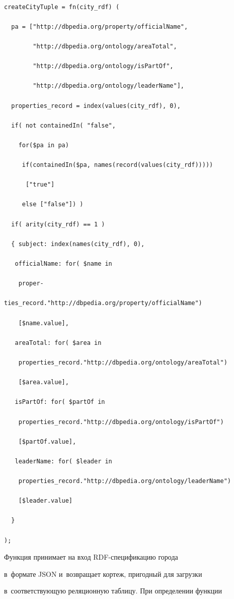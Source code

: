       \begin{verbatim}

createCityTuple = fn(city_rdf) (

  pa = ["http://dbpedia.org/property/officialName",

        "http://dbpedia.org/ontology/areaTotal",

        "http://dbpedia.org/ontology/isPartOf",

        "http://dbpedia.org/ontology/leaderName"],

  properties_record = index(values(city_rdf), 0),

  if( not containedIn( "false",

    for($pa in pa)

     if(containedIn($pa, names(record(values(city_rdf)))))

      ["true"]

     else ["false"]) )

  if( arity(city_rdf) == 1 )

  { subject: index(names(city_rdf), 0),

   officialName: for( $name in

    proper-

ties_record."http://dbpedia.org/property/officialName")

    [$name.value],

   areaTotal: for( $area in

    properties_record."http://dbpedia.org/ontology/areaTotal")

    [$area.value],

   isPartOf: for( $partOf in

    properties_record."http://dbpedia.org/ontology/isPartOf")

    [$partOf.value],

   leaderName: for( $leader in

    properties_record."http://dbpedia.org/ontology/leaderName")

    [$leader.value]

  }

);

\end{verbatim}



      Функция принимает на вход RDF-спе\-ци\-фи\-ка\-цию города

в~формате JSON и~возвращает кортеж, пригодный для загрузки

в~соответствующую реляционную таблицу. При определении функции

